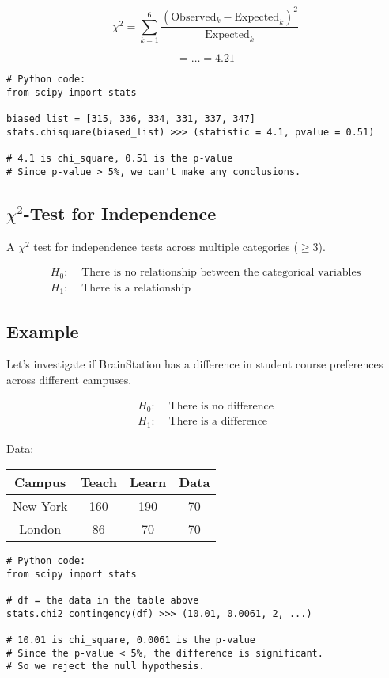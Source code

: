 \documentclass{article}
\theoremstyle{definition}
\theoremstyle{theorem}
\theoremstyle{theorem}
\theoremstyle{theorem}
\theoremstyle{theorem}
\theoremstyle{definition}
\theoremstyle{definition}
\theoremstyle{definition}
\theoremstyle{definition}
\theoremstyle{definition}
\begin{document}
\[
\chi^2 = \sum_{k=1}^{6} \frac{(\text{Observed}_k - \text{Expected}_k)^2}{\text{Expected}_k}
\]

\[
= \ldots = 4.21
\]

\lstset{language=Python}
\begin{lstlisting}
# Python code:
from scipy import stats

biased_list = [315, 336, 334, 331, 337, 347]
stats.chisquare(biased_list) >>> (statistic = 4.1, pvalue = 0.51)

# 4.1 is chi_square, 0.51 is the p-value
# Since p-value > 5%, we can't make any conclusions.
\end{lstlisting}

\subsection{\(\chi^2\)-Test for Independence}

A \(\chi^2\) test for independence tests across multiple categories ($\geq 3$).

\begin{align*}
    H_0: & \text{ There is no relationship between the categorical variables} \\
    H_1: & \text{ There is a relationship}
\end{align*}

\subsection*{Example}
Let's investigate if BrainStation has a difference in student course preferences across different campuses.

\begin{align*}
    H_0: & \text{ There is no difference} \\
    H_1: & \text{ There is a difference}
\end{align*}

Data:

\begin{center}
\begin{tabular}{c|ccc}
Campus & Teach & Learn & Data \\
\hline
New York & 160 & 190 & 70 \\
London & 86 & 70 & 70 \\
\end{tabular}
\end{center}

\lstset{language=Python}
\begin{lstlisting}
# Python code:
from scipy import stats

# df = the data in the table above
stats.chi2_contingency(df) >>> (10.01, 0.0061, 2, ...)

# 10.01 is chi_square, 0.0061 is the p-value
# Since the p-value < 5%, the difference is significant.
# So we reject the null hypothesis.
\end{lstlisting}
\end{document}
